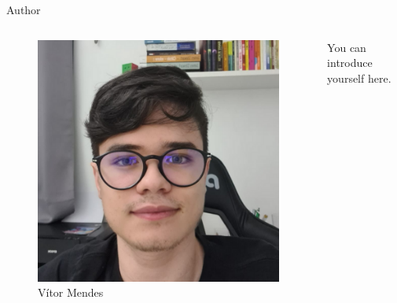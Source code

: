 \begin{frame}{Author}
    \begin{columns}
        \centering
        \begin{column}{0.3\textwidth}
            \begin{figure}
                \centering
                \includegraphics[height = 0.5\textheight]{img/mediador.png}
                \caption[]{Vítor Mendes}
            \end{figure}
        \end{column}
        \centering
        \begin{column}{0.5\textwidth}
            \footnotesize
            \justifying
            You can introduce yourself here.

        \end{column}
    \end{columns}
\end{frame}